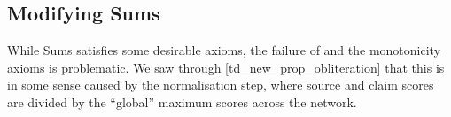 




\subsection{Modifying Sums}
\label{td_new_sec_modifying_sums}

While Sums satisfies some desirable axioms, the failure of
\disjointindependence{} and the monotonicity axioms is problematic. We saw
through \cref{td_new_prop_obliteration} that this is in some sense caused by
the normalisation step, where source and claim scores are divided by the
``global'' maximum scores across the network.

